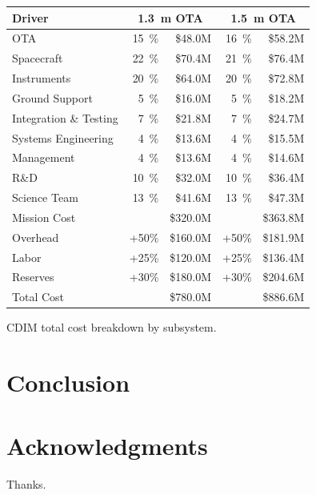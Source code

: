 \documentclass{ws-jai}
\begin{document}
\begin{wstable}[!htp]
  \centering
  \begin{tabular}{@{}lrrrr@{}}\toprule
    Driver        & \multicolumn{2}{c}{\SI{1.3}{\meter} OTA} & \multicolumn{2}{c}{\SI{1.5}{\meter} OTA} \\ \midrule
    OTA           & \SI{15}{\percent}     & \$48.0M      & \SI{16}{\percent}      & \$58.2M      \\
    Spacecraft    & \SI{22}{\percent}     & \$70.4M      & \SI{21}{\percent}      & \$76.4M      \\
    Instruments   & \SI{20}{\percent}     & \$64.0M      & \SI{20}{\percent}      & \$72.8M      \\
    Ground Support& \SI{5}{\percent}      & \$16.0M      & \SI{5}{\percent}       & \$18.2M      \\
    Integration \& Testing & \SI{7}{\percent}      & \$21.8M      & \SI{7}{\percent}      & \$24.7M      \\
    Systems Engineering    & \SI{4}{\percent}      & \$13.6M      & \SI{4}{\percent}      & \$15.5M      \\
    Management    & \SI{4}{\percent}      & \$13.6M      & \SI{4}{\percent}       & \$14.6M      \\
    R\&D          & \SI{10}{\percent}     & \$32.0M      & \SI{10}{\percent}      & \$36.4M      \\
    Science Team  & \SI{13}{\percent}     & \$41.6M      & \SI{13}{\percent}      & \$47.3M      \\ \midrule
    Mission Cost  &                       & \$320.0M     &                        & \$363.8M     \\
    Overhead      & +50\%                 & \$160.0M     & +50\%                  & \$181.9M     \\
    Labor         & +25\%                 & \$120.0M     & +25\%                  & \$136.4M     \\
    Reserves      & +30\%                 & \$180.0M     & +30\%                  & \$204.6M     \\
    Total Cost    &                       & \$780.0M     &                        & \$886.6M     \\ \bottomrule
  \end{tabular}
  \caption{CDIM total cost breakdown by subsystem.
\label{tab:total-cost}
}
\end{wstable}

\clearpage
\section{Conclusion}
\label{sec:conclusion}

\section*{Acknowledgments}
Thanks.


\end{document}
